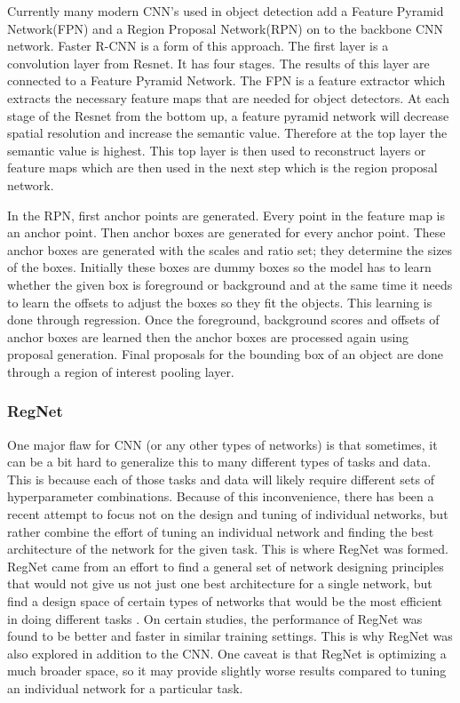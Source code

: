\documentclass[10pt,twocolumn,letterpaper]{article}
\begin{document}
Currently many modern CNN's used in object detection add a Feature Pyramid Network(FPN) \cite{lin2017feature} and a Region Proposal Network(RPN) on to the backbone CNN network. Faster R-CNN\cite{ren2015faster} is a form of this approach. The first layer is a convolution layer from Resnet. It has four stages. The results of this layer are connected to a Feature Pyramid Network\cite{lin2017feature}. The FPN is a feature extractor which extracts the necessary feature maps that are needed for object detectors. At each stage of the Resnet from the bottom up, a feature pyramid network will decrease spatial resolution and increase the semantic value. Therefore at the top layer the semantic value is highest. This top layer is then used to reconstruct layers or feature maps which are then used in the next step which is the region proposal network. 

In the RPN, first anchor points are generated. Every point in the feature map is an anchor point. Then anchor boxes are generated for every anchor point. These anchor boxes are generated with the scales and ratio set; they determine the sizes of the boxes. Initially these boxes are dummy boxes so the model has to learn whether the given box is foreground or background and at the same time it needs to learn the offsets to adjust the boxes so they fit the objects. This learning is done through regression. Once the foreground, background scores and offsets of anchor boxes are learned then the anchor boxes are processed again using proposal generation. Final proposals for the bounding box of an object are done through a region of interest pooling layer.

\vspace{-4.5mm}

\subsubsection{RegNet}
One major flaw for CNN (or any other types of networks) is that sometimes, it can be a bit hard to generalize this to many different types of tasks and data. This is because each of those tasks and data will likely require different sets of hyperparameter combinations. Because of this inconvenience, there has been a recent attempt to focus not on the design and tuning of individual networks, but rather combine the effort of tuning an individual network and finding the best architecture of the network for the given task. This is where RegNet was formed. RegNet came from an effort to find a general set of network designing principles that would not give us not just one best architecture for a single network, but find a design space of certain types of networks that would be the most efficient in doing different tasks \cite{NetworkDesignSpace}. On certain studies, the performance of RegNet was found to be better and faster in similar training settings. This is why RegNet was also explored in addition to the CNN. One caveat is that RegNet is optimizing a much broader space, so it may provide slightly worse results compared to tuning an individual network for a particular task. 
\end{document}
